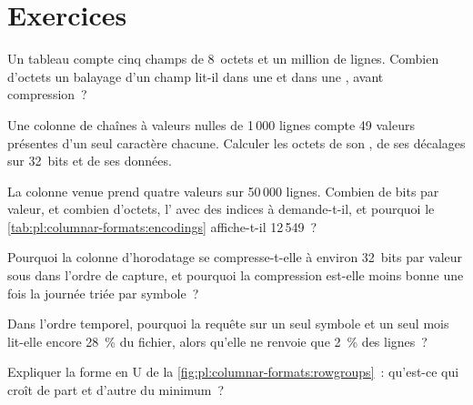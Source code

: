 \section{Exercices}

\begin{exercise}[$\star$]\label{exo:pl:columnar-formats:1}
Un tableau compte cinq champs de 8~octets et un million de lignes. Combien d'octets un balayage d'un champ lit-il dans une  et dans une
, avant compression~?
\end{exercise}

\begin{exercise}[$\star$]\label{exo:pl:columnar-formats:2}
Une colonne de chaînes à valeurs nulles de 1\,000 lignes compte 49 valeurs présentes d'un seul caractère chacune. Calculer les octets de son , de ses
décalages sur 32~bits et de ses données.
\end{exercise}

\begin{exercise}[$\star$]\label{exo:pl:columnar-formats:3}
La colonne venue prend quatre valeurs sur 50\,000 lignes. Combien de bits par valeur, et combien d'octets, l' avec
des indices à  demande-t-il, et pourquoi le \cref{tab:pl:columnar-formats:encodings} affiche-t-il 12\,549~?
\end{exercise}

\begin{exercise}[$\star\star$]\label{exo:pl:columnar-formats:4}
Pourquoi la colonne d'horodatage se compresse-t-elle à environ 32~bits par valeur sous  dans l'ordre de capture,
et pourquoi la compression est-elle moins bonne une fois la journée triée par symbole~?
\end{exercise}

\begin{exercise}[$\star\star$]\label{exo:pl:columnar-formats:5}
Dans l'ordre temporel, pourquoi la requête sur un seul symbole et un seul mois lit-elle encore 28~\% du fichier, alors qu'elle ne renvoie que 2~\% des lignes~?
\end{exercise}

\begin{exercise}[$\star\star$]\label{exo:pl:columnar-formats:6}
Expliquer la forme en U de la \cref{fig:pl:columnar-formats:rowgroups}~: qu'est-ce qui croît de part et d'autre du minimum~?
\end{exercise}

